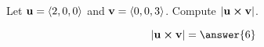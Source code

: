 \documentclass{ximera}
\author{Gregory Hartman \and Matthew Carr}
\begin{document}
\begin{exercise}



Let $\mathbf{u}=\left\langle 2,0,0\right\rangle$ and $\mathbf{v}=\left\langle 0,0,3\right\rangle$. Compute $|\mathbf{u}\boldsymbol\times\mathbf{v}|$.

\begin{prompt}
\[
|\vec{u}\cross\vec{v}|=\answer{6}
\]
\end{prompt}


\end{exercise}
\end{document}
